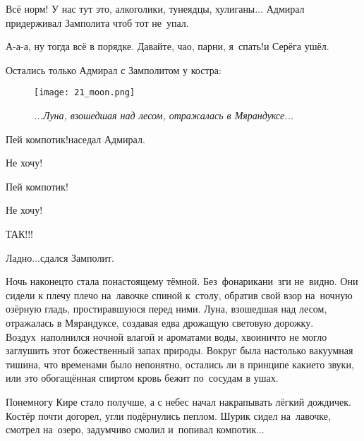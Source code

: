 \diagdash Всё норм! У нас тут это, алкоголики, тунеядцы, хулиганы$\ldots$ \mdash Адмирал придерживал Замполита чтоб тот не~упал.

\diagdash А-а-а, ну тогда всё в порядке. Давайте, чао, парни, я~спать!\mdash и Серёга ушёл.


Остались только Адмирал с Замполитом у костра: 

\setlength{\belowcaptionskip}{-10pt}
\begin{figure}[h]
	\centering
	\texttt{[image: 21\_moon.png]}
	\caption{\small\textit{...Луна, взошедшая над лесом, отражалась в Мярандуксе...}}
\end{figure}

\diagdash Пей компотик!\mdash наседал Адмирал.

\diagdash Не хочу!

\diagdash Пей компотик!

\diagdash Не хочу!

\diagdash ТАК!!!

\diagdash Ладно$\ldots$\mdash сдался Замполит.


Ночь наконец\sdash то стала по\sdash настоящему тёмной. Без~фонарика\mdash ни~зги не~видно. Они сидели к плечу плечо на~лавочке спиной к~столу, обратив свой взор на~ночную озёрную гладь, простиравшуюся перед ними. Луна, взошедшая над лесом, отражалась в Мярандуксе, создавая едва дрожащую световую дорожку. Воздух~наполнился ночной влагой и ароматами воды, хвои\mdash ничто не могло заглушить этот божественный запах природы. Вокруг была настолько вакуумная тишина, что временами было непонятно, остались ли в принципе какие\sdash то звуки, или это обогащённая спиртом кровь бежит по~сосудам в ушах.



Понемногу Кире стало получше, а с небес начал накрапывать лёгкий дождичек. Костёр почти догорел, угли подёрнулись пеплом. Шурик сидел на~лавочке, смотрел на~озеро, задумчиво смолил и~попивал компотик$\ldots$



\begin{center}
\end{center}
